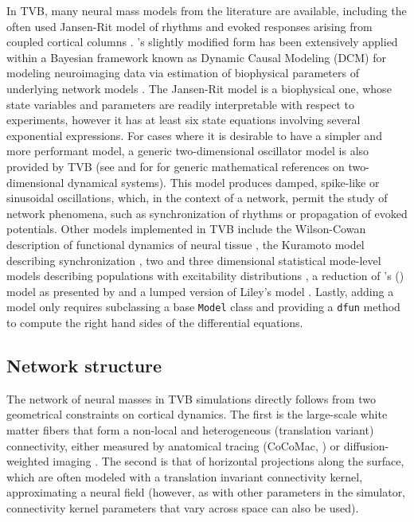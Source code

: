 \documentclass{bioinfo}
\begin{document}
In TVB, many neural mass models from the literature are available, including
the often used Jansen-Rit model of rhythms and evoked responses arising from
coupled cortical columns \citep{Zetterberg_1978, Jansen_1995,Spiegler_2010}.
\citeauthor{David_2003}'s slightly modified form has been extensively applied
within a Bayesian framework known as Dynamic Causal Modeling (DCM) for modeling
neuroimaging data via estimation of biophysical parameters of underlying
network models \citep{David_2003, friston2003dynamic, david2006dynamic}.  The
Jansen-Rit model is a biophysical one, whose state variables and parameters are
readily interpretable with respect to experiments, however it has at least six
state equations involving several exponential expressions. For cases where it
is desirable to have a simpler and more performant model, a generic
two-dimensional oscillator model is also provided by TVB (see 
\cite{strogatz2001nonlinear} and \cite{guckenheimer1983nonlinear} for 
for generic mathematical references on two-dimensional dynamical systems).
This model produces
damped, spike-like or sinusoidal oscillations, which, in the context of a
network, permit the study of network phenomena, such as synchronization of
rhythms or propagation of evoked potentials.  Other models implemented in TVB
include the Wilson-Cowan description of functional dynamics of neural tissue
\citep{Wilson_1972}, the Kuramoto model describing synchronization
\citep{Kuramoto_1975, Cabral_2011}, two and three dimensional statistical
mode-level models describing populations with excitability distributions
\citep{Stefanescu_2011, Stefanescu_2008}, a reduction of
\citeauthor{Wong_2006}'s (\citeyear{Wong_2006}) model as presented by
\cite{Deco_2013} and a lumped version of Liley's model \citep{Liley_1999,
Steyn-Ross_1999}.  Lastly, adding a model only requires subclassing a base
\texttt{Model} class and providing a  \texttt{dfun} method to compute the right
hand sides of the differential equations. 

\subsection{Network structure}

The network of neural masses in TVB simulations directly follows from  two
 geometrical constraints on cortical dynamics. The first is the
large-scale white matter fibers that form a non-local and heterogeneous
(translation variant) connectivity, either measured by anatomical tracing
(CoCoMac, \cite{Koetter_2004}) or diffusion-weighted imaging 
\citep{Hagmann_2008, Honey_2009, Bastiani_2012}.
The second is that of horizontal projections
along the surface, which are often modeled with a translation invariant
connectivity kernel, approximating a neural field (however, as with other
parameters in the simulator, connectivity kernel parameters that vary 
across space can also be used).
\end{document}
